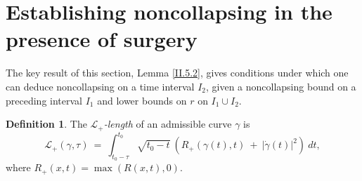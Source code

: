 \documentclass[12pt]{amsart}
\numberwithin{equation}{section}
\theoremstyle{plain}
\theoremstyle{definition}
\newtheorem{definition}[equation]{Definition}
\theoremstyle{remark}
\begin{document}
\section{Establishing noncollapsing in the presence of surgery}
\label{II.5.2section}

The key result of this section, Lemma \ref{II.5.2},
gives conditions under which
one can deduce noncollapsing on a time interval $I_2$, given 
a noncollapsing bound on a preceding interval $I_1$ and
lower bounds on $r$ on $I_1\cup I_2$.

\begin{definition}
The {\em ${\mathcal L}_+$-length} of an admissible curve $\gamma$ is
\begin{equation}
{\mathcal L}_+(\gamma, \tau) \: = \:
\int_{t_0 - \tau}^{t_0} \sqrt{t_0 - t} \: \left(
R_+(\gamma(t), t) \: + \: |\dot{\gamma}(t)|^2 \right) \: dt,
\end{equation}
where $R_+(x,t) = \max(R(x,t), 0)$.
\end{definition}
\end{document}
